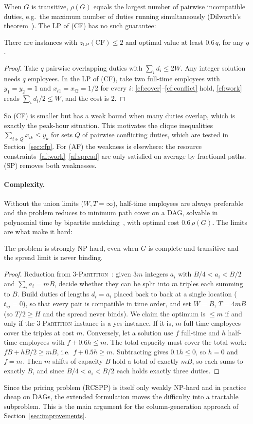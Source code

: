 When $G$ is transitive, $\rho(G)$ equals the largest number of pairwise
incompatible duties, e.g.\ the maximum number of duties running
simultaneously (Dilworth's theorem~\cite{dilworth1950}). The LP of (CF) has
no such guarantee:

\begin{proposition}\label{prop:lp-cf}
There are instances with $z_{\mathrm{LP}}(\mathrm{CF})\le 2$ and optimal value
at least $0.6\,q$, for any $q$.
\end{proposition}
\begin{proof}
Take $q$ pairwise overlapping duties with $\sum_i d_i\le 2W$. Any integer
solution needs $q$ employees. In the LP of (CF), take two full-time employees
with $y_1=y_2=1$ and $x_{i1}=x_{i2}=1/2$ for every $i$:
\eqref{cf:cover}--\eqref{cf:conflict} hold, \eqref{cf:work} reads
$\sum_i d_i/2\le W$, and the cost is $2$.
\end{proof}

So (CF) is smaller but has a weak bound when many duties overlap, which is
exactly the peak-hour situation. This motivates the clique inequalities
$\sum_{i\in Q}x_{ik}\le y_k$ for sets $Q$ of pairwise conflicting duties,
which are tested in Section~\ref{sec:cfp}. For (AF) the weakness is
elsewhere: the resource constraints~\eqref{af:work}--\eqref{af:spread} are only
satisfied on average by fractional paths. (SP) removes both weaknesses.

\paragraph{Complexity.}
Without the union limits ($W,T=\infty$), half-time employees are always
preferable and the problem reduces to minimum path cover on a DAG, solvable
in polynomial time by bipartite matching~\cite{fulkerson1956}, with optimal
cost $0.6\,\rho(G)$. The limits are what make it hard:

\begin{proposition}\label{prop:np}
The problem is strongly NP-hard, even when $G$ is complete and transitive and
the spread limit is never binding.
\end{proposition}
\begin{proof}
Reduction from \textsc{3-Partition}~\cite{garey1979}: given $3m$ integers
$a_i$ with $B/4<a_i<B/2$ and $\sum_i a_i=mB$, decide whether they can be split
into $m$ triples each summing to $B$. Build duties of lengths $d_i=a_i$
placed back to back at a single location ($t_{ij}=0$), so that every pair is
compatible in time order, and set $W=B$, $T=4mB$ (so $T/2\ge H$ and the spread
never binds). We claim the optimum is $\le m$ if and only if the
\textsc{3-Partition} instance is a yes-instance. If it is, $m$ full-time
employees cover the triples at cost $m$. Conversely, let a solution use $f$
full-time and $h$ half-time employees with $f+0.6h\le m$. The total capacity
must cover the total work: $fB+hB/2\ge mB$, i.e.\ $f+0.5h\ge m$. Subtracting
gives $0.1h\le 0$, so $h=0$ and $f=m$. Then $m$ shifts of capacity $B$ hold a
total of exactly $mB$, so each sums to exactly $B$, and since
$B/4<a_i<B/2$ each holds exactly three duties.
\end{proof}

Since the pricing problem (RCSPP) is itself only weakly NP-hard and in
practice cheap on DAGs, the extended formulation moves the difficulty into a
tractable subproblem. This is the main argument for the column-generation
approach of Section~\ref{sec:improvements}.
